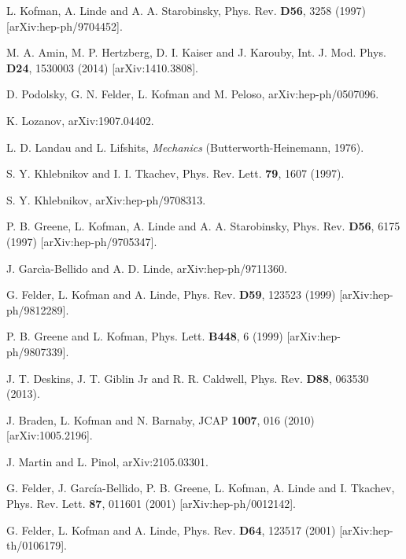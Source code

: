 \documentclass[11pt,a4paper,twoside]{book}
\begin{document}
\begin{thebibliography}{2}
	 L. Kofman, A. Linde and A. A. Starobinsky, Phys. Rev. \textbf{D56}, 3258 (1997) [arXiv:hep-ph/9704452].
	
	 M. A. Amin, M. P. Hertzberg, D. I. Kaiser and J. Karouby, Int. J.  Mod. Phys. \textbf{D24}, 1530003 (2014) [arXiv:1410.3808].
	
	 D. Podolsky, G. N. Felder, L. Kofman and M. Peloso,  arXiv:hep-ph/0507096.
	
	 K. Lozanov, arXiv:1907.04402.
	
	 L. D. Landau and L. Lifshits, \textit{Mechanics} (Butterworth-Heinemann, 1976).
	
	 S. Y. Khlebnikov and I. I. Tkachev, Phys. Rev. Lett. \textbf{79}, 1607 (1997).
	
	 S. Y. Khlebnikov, arXiv:hep-ph/9708313.
	
	 P. B. Greene, L. Kofman, A. Linde and A. A. Starobinsky, Phys. Rev. \textbf{D56}, 6175 (1997) [arXiv:hep-ph/9705347].
	
	 J. Garcìa-Bellido and A. D. Linde, arXiv:hep-ph/9711360.
	
	 G. Felder, L. Kofman and A. Linde, Phys. Rev. \textbf{D59}, 123523 (1999) [arXiv:hep-ph/9812289].
	
	 P. B. Greene and L. Kofman, Phys. Lett. \textbf{B448}, 6 (1999) [arXiv:hep-ph/9807339].
	
	 J. T. Deskins, J. T. Giblin Jr and R. R. Caldwell, Phys. Rev. \textbf{D88}, 063530 (2013).
	
	 J. Braden, L. Kofman and N. Barnaby, JCAP \textbf{1007}, 016 (2010) [arXiv:1005.2196].
	
	 J. Martin and L. Pinol, arXiv:2105.03301.
	
	 G. Felder, J. Garc\'{i}a-Bellido, P. B. Greene, L. Kofman, A. Linde and I. Tkachev, Phys. Rev. Lett. \textbf{87}, 011601 (2001) [arXiv:hep-ph/0012142].
	
	 G. Felder, L. Kofman and A. Linde, Phys. Rev. \textbf{D64}, 123517 (2001) [arXiv:hep-th/0106179].
	

\end{thebibliography}
\end{document}
